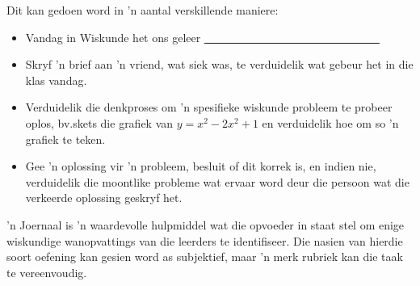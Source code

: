 Dit kan gedoen word in 'n aantal verskillende maniere:
\begin{itemize}[noitemsep]
\item
  Vandag in Wiskunde het ons geleer \underline{~~~~~~~~~~~~~~~~~~~~~~~~~~~~~~~} 
\item
  Skryf 'n brief aan 'n vriend, wat siek was, te verduidelik wat
  gebeur het in die klas vandag.
\item
  Verduidelik die denkproses om 'n spesifieke wiskunde probleem te
  probeer oplos, bv.\@ skets die grafiek van $y = x^2 - 2x^2 + 1$ en
  verduidelik hoe om so 'n grafiek te teken.
\item
  Gee 'n oplossing vir 'n probleem, besluit of dit korrek is, en
  indien nie, verduidelik die moontlike probleme wat ervaar word deur
  die persoon wat die verkeerde oplossing geskryf het.
\end{itemize}
'n Joernaal is 'n waardevolle hulpmiddel wat die opvoeder in staat stel om enige wiskundige wanopvattings van die leerders te identifiseer. Die nasien van hierdie soort oefening kan gesien word as subjektief, maar 'n merk rubriek kan die taak te vereenvoudig.

